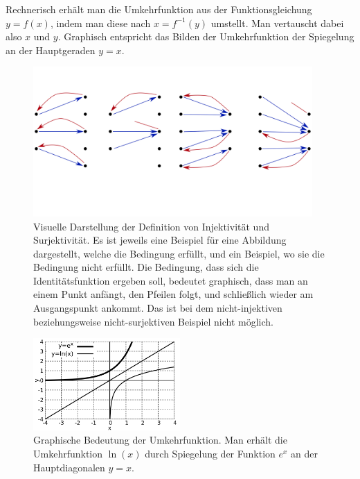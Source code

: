 Rechnerisch erhält man die Umkehrfunktion aus der Funktionsgleichung $y = f(x)$, indem man diese nach $x = f^{-1}(y)$ umstellt. Man vertauscht dabei also $x$ und $y$. Graphisch entspricht das Bilden der Umkehrfunktion der Spiegelung an der Hauptgeraden $y=x$.

\begin{figure}
    \centering
    \includegraphics[width=0.95\textwidth]{./svg/injective-surjective}
    \caption{Visuelle Darstellung der Definition von Injektivität und Surjektivität. Es ist jeweils eine Beispiel für eine Abbildung dargestellt, welche die Bedingung erfüllt, und ein Beispiel, wo sie die Bedingung nicht erfüllt. Die Bedingung, dass sich die Identitätsfunktion ergeben soll, bedeutet graphisch, dass man an einem Punkt anfängt, den Pfeilen folgt, und schließlich wieder am Ausgangspunkt ankommt. Das ist bei dem nicht-injektiven beziehungsweise nicht-surjektiven Beispiel nicht möglich.}
    \label{fig:InjectSurject}
\end{figure}

\begin{figure}
    \centering
    \includegraphics[width=0.5\textwidth]{./gnuplot/inverse-function-reflection}
    \caption{Graphische Bedeutung der Umkehrfunktion. Man erhält die Umkehrfunktion $\ln(x)$ durch Spiegelung der Funktion $e^x$ an der Hauptdiagonalen $y=x$.}
    \label{fig:InvFunRefl}
\end{figure}

